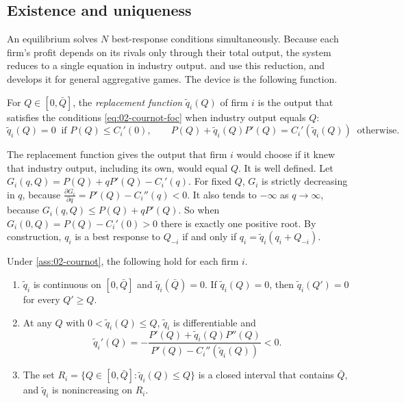 \subsection{Existence and uniqueness}\label{sec:02-cournot-exist}

An equilibrium solves $N$ best-response conditions simultaneously. Because each firm's profit depends on its rivals
only through their total output, the system reduces to a single equation in industry output.
\citet{SzidarovszkyYakowitz1977} and \citet{Novshek1985} use this reduction, and \citet{Vives1999} develops it for
general aggregative games. The device is the following function.

\begin{definition}\label{def:02-replacement}
For $Q \in [0, \bar Q]$, the \emph{replacement function} $\tilde q_i(Q)$ of firm $i$ is the output that satisfies
the conditions \eqref{eq:02-cournot-foc} when industry output equals $Q$:
\[
  \tilde q_i(Q) = 0 \ \text{ if } P(Q) \le C_i'(0), \qquad
  P(Q) + \tilde q_i(Q)P'(Q) = C_i'(\tilde q_i(Q)) \ \text{ otherwise}.
\]
\end{definition}

The replacement function gives the output that firm $i$ would choose if it knew that industry output, including its
own, would equal $Q$. It is well defined. Let $G_i(q, Q) = P(Q) + qP'(Q) - C_i'(q)$. For fixed $Q$, $G_i$ is
strictly decreasing in $q$, because $\frac{\partial G_i}{\partial q} = P'(Q) - C_i''(q) < 0$. It also tends to
$-\infty$ as $q \to \infty$, because $G_i(q, Q) \le P(Q) + qP'(Q)$. So when $G_i(0, Q) = P(Q) - C_i'(0) > 0$ there
is exactly one positive root. By construction, $q_i$ is a best response to $Q_{-i}$ if and only if
$q_i = \tilde q_i(q_i + Q_{-i})$.

\begin{lemma}\label{lem:02-replacement}
Under \cref{ass:02-cournot}, the following hold for each firm $i$.
\begin{enumerate}[label=(\roman*)]
  \item $\tilde q_i$ is continuous on $[0, \bar Q]$ and $\tilde q_i(\bar Q) = 0$. If $\tilde q_i(Q) = 0$, then
  $\tilde q_i(Q') = 0$ for every $Q' \ge Q$.
  \item At any $Q$ with $0 < \tilde q_i(Q) \le Q$, $\tilde q_i$ is differentiable and
  \begin{equation}\label{eq:02-replacement-slope}
    \tilde q_i'(Q) = -\frac{P'(Q) + \tilde q_i(Q)P''(Q)}{P'(Q) - C_i''(\tilde q_i(Q))} < 0 .
  \end{equation}
  \item The set $R_i = \{Q \in [0, \bar Q] : \tilde q_i(Q) \le Q\}$ is a closed interval that contains $\bar Q$,
  and $\tilde q_i$ is nonincreasing on $R_i$.
\end{enumerate}
\end{lemma}


